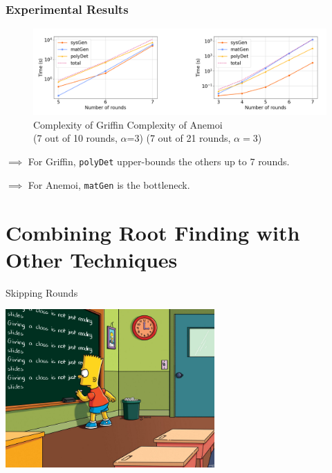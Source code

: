 \documentclass[aspectratio=169]{beamer}
\begin{document}
\begin{frame}
  \frametitle{Experimental Results}

  \begin{figure}
    \centering
    \includegraphics[width=.9\textwidth]{./figures/complexite-griffin-anemoi.png}

    \caption{\hspace{20pt} Complexity of Griffin  \hspace{105pt} Complexity of Anemoi \\ \hspace{45pt} (7 out of 10 rounds, $\alpha$=3) \hspace{83pt} (7 out of 21 rounds, $\alpha=3$)}
  \end{figure}

  \pause
  $\implies$ For Griffin, \texttt{polyDet} upper-bounds the others up to 7 rounds.

  $\implies$ For Anemoi, \texttt{matGen} is the bottleneck.
  
\end{frame}


\section{Combining Root Finding with Other Techniques}


\begin{frame}{Skipping Rounds}
  \vfill

  \begin{center}
    \includegraphics[width=8cm]{./figures/simpsons}
  \end{center}
  
  \vfill
\end{frame}
\end{document}
